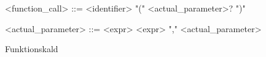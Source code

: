 \begin{Grammar}
 \begin{grammar}
    
    <function\_call> ::= <identifier> "(" <actual\_parameter>? ")"
 
 <actual\_parameter> ::= <expr>
 \alt <expr> "," <actual\_parameter>
    
 \end{grammar}
 \caption{Funktionskald}\label{gra:call}
\end{Grammar}




